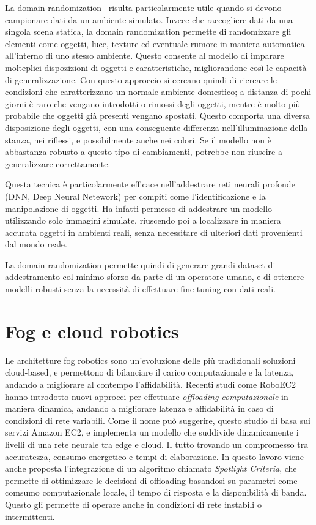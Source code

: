 \documentclass[12pt]{report}
\begin{document}
La domain randomization~\cite{8202133} risulta particolarmente utile quando si devono campionare dati da un ambiente simulato. Invece che raccogliere dati da una singola scena statica, la domain randomization permette di randomizzare gli elementi come oggetti, luce, texture ed eventuale rumore in maniera automatica all'interno di uno stesso ambiente. Questo consente al modello di imparare molteplici dispozizioni di oggetti e caratteristiche, migliorandone così le capacità di generalizzazione. Con questo approccio si cercano quindi di ricreare le condizioni che caratterizzano un normale ambiente domestico; a distanza di pochi giorni è raro che vengano introdotti o rimossi degli oggetti, mentre è molto più probabile che oggetti già presenti vengano spostati. Questo comporta una diversa disposizione degli oggetti, con una conseguente differenza nell'illuminazione della stanza, nei riflessi, e possibilmente anche nei colori. Se il modello non è abbastanza robusto a questo tipo di cambiamenti, potrebbe non riuscire a generalizzare correttamente.

Questa tecnica è particolarmente efficace nell'addestrare reti neurali profonde (DNN, Deep Neural Netework) per compiti come l'identificazione e la manipolazione di oggetti. Ha infatti permesso di addestrare un modello utilizzando solo immagini simulate, riuscendo poi a localizzare in maniera accurata oggetti in ambienti reali, senza necessitare di ulteriori dati provenienti dal mondo reale.

La domain randomization permette quindi di generare grandi dataset di addestramento col minimo sforzo da parte di un operatore umano, e di ottenere modelli robusti senza la necessità di effettuare fine tuning con dati reali.

\section{Fog e cloud robotics}
\label{sec:fog_e_cloud_robotics}

Le architetture fog robotics sono un'evoluzione delle più tradizionali soluzioni cloud-based, e permettono di bilanciare il carico computazionale e la latenza, andando a migliorare al contempo l'affidabilità. Recenti studi come RoboEC2~\cite{10347007} hanno introdotto nuovi approcci per effettuare \textit{offloading computazionale} in maniera dinamica, andando a migliorare latenza e affidabilità in caso di condizioni di rete variabili. Come il nome può suggerire, questo studio di basa sui servizi Amazon EC2, e implementa un modello che suddivide dinamicamente i livelli di una rete neurale tra edge e cloud. Il tutto trovando un compromesso tra accuratezza, consumo energetico e tempi di elaborazione. In questo lavoro viene anche proposta l'integrazione di un algoritmo chiamato \textit{Spotlight Criteria}, che permette di ottimizzare le decisioni di offloading basandosi su parametri come comsumo computazionale locale, il tempo di risposta e la disponibilità di banda. Questo gli permette di operare anche in condizioni di rete instabili o intermittenti.
\end{document}
